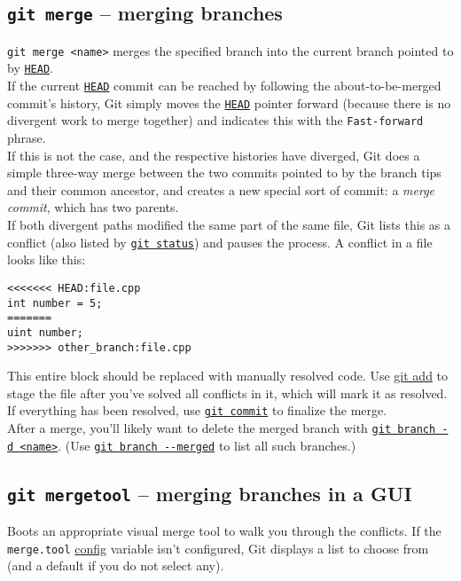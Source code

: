 \documentclass[8pt, table, xcdraw]{article}%
\begin{document}
\subsection{\lstinline{git merge} -- merging branches} \label{merge}

\lstinline{git merge <name>} merges the specified branch into the current branch pointed to by \hyperref[branching]{\lstinline{HEAD}}.\\
If the current \hyperref[branching]{\lstinline{HEAD}} commit can be reached by following the about-to-be-merged commit’s history, Git simply moves the \hyperref[branching]{\lstinline{HEAD}} pointer forward (because there is no divergent work to merge together) and indicates this with the \lstinline{Fast-forward} phrase.\\
If this is not the case, and the respective histories have diverged, Git does a simple three-way merge between the two commits pointed to by the branch tips and their common ancestor, and creates a new special sort of commit: a \emph{merge commit}, which has two parents.\\
If both divergent paths modified the same part of the same file, Git lists this as a conflict (also listed by \hyperref[status]{\lstinline{git status}}) and pauses the process. A conflict in a file looks like this:

\begin{lstlisting}
<<<<<<< HEAD:file.cpp
int number = 5;
=======
uint number;
>>>>>>> other_branch:file.cpp
\end{lstlisting}

This entire block should be replaced with manually resolved code. Use \hyperref[add]{git add} to stage the file after you've solved all conflicts in it, which will mark it as resolved. If everything has been resolved, use \hyperref[commit]{\lstinline{git commit}} to finalize the merge.\\
After a merge, you'll likely want to delete the merged branch with \hyperref[branch]{\lstinline{git branch -d <name>}}. (Use \hyperref[merge]{\lstinline{git branch --merged}} to list all such branches.)

\subsection{\lstinline{git mergetool} -- merging branches in a GUI} \label{mergetool}

Boots an appropriate visual merge tool to walk you through the conflicts. If the \lstinline{merge.tool} \hyperref[config]{config} variable isn't configured, Git displays a list to choose from (and a default if you do not select any).
\end{document}
